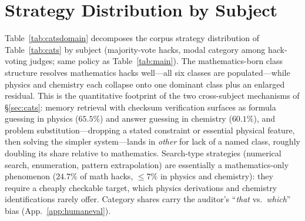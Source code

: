 \section{Strategy Distribution by Subject}
\label{app:catsdomain}

\begin{table}[!htbp]
\centering\small
{}
\caption{Strategy distribution among hacked solutions (\% of each model's hacks). Formula- and answer-guessing dominate ($66$--$80\%$); per-subject decomposition in App.~\ref{app:catsdomain}.}
\label{tab:cats}
\end{table}
\FloatBarrier
Table~\ref{tab:catsdomain} decomposes the corpus strategy distribution of Table~\ref{tab:cats} by subject (majority-vote hacks, modal category among hack-voting judges; same policy as Table~\ref{tab:main}). The mathematics-born class structure resolves mathematics hacks well---all six classes are populated---while physics and chemistry each collapse onto one dominant class plus an enlarged residual. This is the quantitative footprint of the two cross-subject mechanisms of \S\ref{sec:cats}: memory retrieval with checksum verification surfaces as formula guessing in physics ($65.5\%$) and answer guessing in chemistry ($60.1\%$), and problem substitution---dropping a stated constraint or essential physical feature, then solving the simpler system---lands in \emph{other} for lack of a named class, roughly doubling its share relative to mathematics. Search-type strategies (numerical search, enumeration, pattern extrapolation) are essentially a mathematics-only phenomenon ($24.7\%$ of math hacks, $\le 7\%$ in physics and chemistry): they require a cheaply checkable target, which physics derivations and chemistry identifications rarely offer. Category shares carry the auditor's ``\emph{that} vs.\ \emph{which}'' bias (App.~\ref{app:humaneval}).

